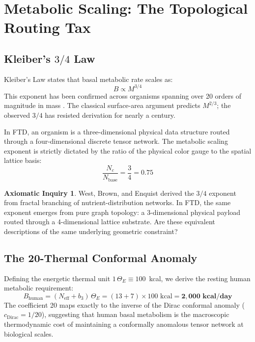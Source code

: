 \documentclass[11pt, letterpaper]{article}
\theoremstyle{definition}
\newtheorem{inquiry}{Axiomatic Inquiry}[section]
\theoremstyle{remark}
\begin{document}
\section{Metabolic Scaling: The Topological Routing Tax}

\subsection{Kleiber's $3/4$ Law}

Kleiber's Law \cite{Kleiber1932} states that basal metabolic rate scales as:
\begin{equation}
    B \propto M^{3/4}
\end{equation}
This exponent has been confirmed across organisms spanning over 20 orders of magnitude in mass \cite{West1997}. The classical surface-area argument predicts $M^{2/3}$; the observed $3/4$ has resisted derivation for nearly a century.

In FTD, an organism is a three-dimensional physical data structure routed through a four-dimensional discrete tensor network. The metabolic scaling exponent is strictly dictated by the ratio of the physical color gauge to the spatial lattice basis:
\begin{equation}
    \frac{N_c}{N_{\text{base}}} = \frac{3}{4} = 0.75
\end{equation}

\begin{inquiry}
West, Brown, and Enquist \cite{West1997} derived the $3/4$ exponent from fractal branching of nutrient-distribution networks. In FTD, the same exponent emerges from pure graph topology: a 3-dimensional physical payload routed through a 4-dimensional lattice substrate. Are these equivalent descriptions of the same underlying geometric constraint?
\end{inquiry}

\subsection{The 20-Thermal Conformal Anomaly}

Defining the energetic thermal unit $1\,\Theta_E \equiv 100$~kcal, we derive the resting human metabolic requirement:
\begin{equation}
    B_{\text{human}} = (N_{\text{eff}} + b_3)\,\Theta_E = (13 + 7) \times 100 \text{ kcal} = \mathbf{2{,}000 \text{ kcal/day}}
\end{equation}
The coefficient 20 maps exactly to the inverse of the Dirac conformal anomaly ($c_{\text{Dirac}} = 1/20$), suggesting that human basal metabolism is the macroscopic thermodynamic cost of maintaining a conformally anomalous tensor network at biological scales.
\end{document}
